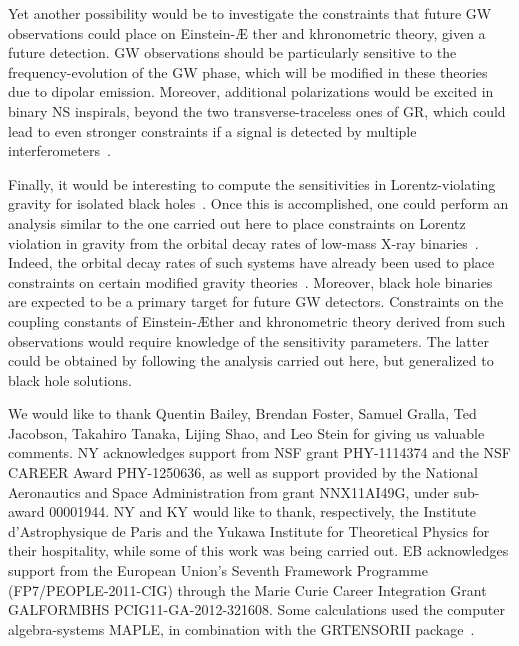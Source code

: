 \documentclass[prd,aps,twocolumn,nofootinbib,showpacs,superscriptaddress]{revtex4-1}
\begin{document}
Yet another possibility would be to investigate the constraints that
future GW observations could place on Einstein-\AE
ther and khronometric theory, given a future
detection. GW observations should be particularly
sensitive to the frequency-evolution of the GW phase,
which will be modified in these theories due to dipolar emission. 
Moreover, additional polarizations would be
excited in binary NS inspirals, beyond the two transverse-traceless
ones of GR, which could lead to even stronger constraints if a signal
is detected by multiple interferometers~\cite{Chatziioannou:2012rf}. 

Finally, it would be interesting to compute the sensitivities in Lorentz-violating
gravity for isolated black holes~\cite{Eling:2006ec,Blas:2011ni,Barausse:2011pu,Barausse:2013nwa,Barausse:2012ny,Barausse:2012qh,Barausse:2013nwa}. Once this is accomplished, one could perform an analysis similar to the one carried out here to place constraints on Lorentz violation in gravity from the orbital decay rates of low-mass X-ray binaries~\cite{johannsen1,gonzalez,Hernandez:2013haa}. Indeed, the orbital decay rates of such systems have already been used to place constraints on certain modified gravity theories~\cite{zaglauer,psaltisBD,johannsen1,johannsen2,kent-LMXB}. Moreover, black hole binaries are expected to be a primary
target for future GW detectors. Constraints on the coupling constants 
of Einstein-\AE ther and khronometric theory derived from such observations would 
require knowledge of the sensitivity parameters. The latter could be obtained
by following the analysis carried out here, but generalized to black hole solutions.

\acknowledgments
 We would like to thank Quentin Bailey, Brendan Foster, Samuel Gralla, Ted Jacobson, 
Takahiro Tanaka, Lijing Shao, and Leo Stein for giving us valuable comments. NY
acknowledges support from NSF grant PHY-1114374 and the NSF CAREER
Award PHY-1250636, as well as support provided by the National
Aeronautics and Space Administration from grant NNX11AI49G, under
sub-award 00001944. NY and KY would like to thank, respectively, the Institute
d'Astrophysique de Paris and the Yukawa Institute for Theoretical
Physics for their hospitality, while some of this work was being
carried out. EB acknowledges support from the European Union's Seventh
Framework Programme (FP7/PEOPLE-2011-CIG) through the Marie Curie
Career Integration Grant GALFORMBHS PCIG11-GA-2012-321608.  Some calculations used the
computer algebra-systems MAPLE, in combination with the GRTENSORII
package~\cite{grtensor}. 
\end{document}
